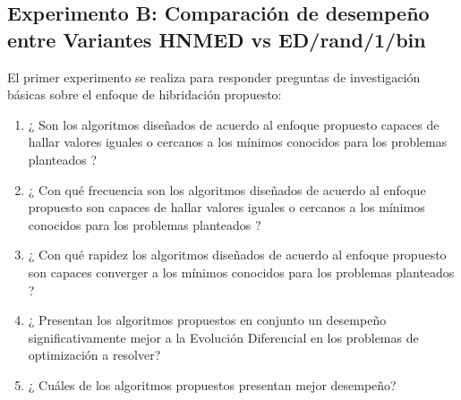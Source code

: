 \subsection{Experimento B: Comparación de desempeño entre Variantes HNMED vs ED/rand/1/bin}
El primer experimento se realiza para responder preguntas de investigación básicas sobre el enfoque de hibridación propuesto:
\begin{enumerate}
	\item ¿ Son los algoritmos diseñados de acuerdo al enfoque propuesto capaces de hallar valores iguales o cercanos a los mínimos conocidos para los problemas planteados ?
	\item ¿ Con qué frecuencia son los algoritmos diseñados de acuerdo al enfoque propuesto son capaces de hallar valores iguales o cercanos a  los mínimos conocidos para los problemas planteados ?
	\item ¿ Con qué rapidez los algoritmos diseñados de acuerdo al enfoque propuesto son capaces converger a los mínimos conocidos para los problemas planteados ?
	\item ¿ Presentan los algoritmos propuestos en conjunto un desempeño significativamente mejor a la Evolución Diferencial en los problemas de optimización a resolver?
	\item ¿ Cuáles de los algoritmos propuestos presentan mejor desempeño?
\end{enumerate}
